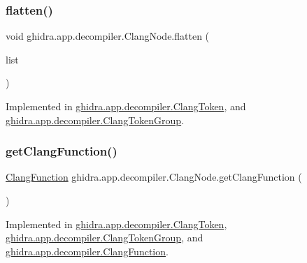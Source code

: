 \subsubsection{\texorpdfstring{flatten()}{flatten()}}
{\footnotesize\ttfamily void ghidra.\+app.\+decompiler.\+Clang\+Node.\+flatten (\begin{DoxyParamCaption}\item[{\mbox{\hyperlink{xml_8hh_ab5ab62f46b3735557c125f91b40ac155}{List}}$<$ \mbox{\hyperlink{interfaceghidra_1_1app_1_1decompiler_1_1_clang_node}{Clang\+Node}} $>$}]{list }\end{DoxyParamCaption})}



Implemented in \mbox{\hyperlink{classghidra_1_1app_1_1decompiler_1_1_clang_token_ac9713a2cef771ae4ac71d0989593b3ed}{ghidra.\+app.\+decompiler.\+Clang\+Token}}, and \mbox{\hyperlink{classghidra_1_1app_1_1decompiler_1_1_clang_token_group_ac469bdd22ba48a2941a40779f2e4630a}{ghidra.\+app.\+decompiler.\+Clang\+Token\+Group}}.

\mbox{\label{interfaceghidra_1_1app_1_1decompiler_1_1_clang_node_a715989d3fa33942a85517fae04a70ac0}} 
\subsubsection{\texorpdfstring{getClangFunction()}{getClangFunction()}}
{\footnotesize\ttfamily \mbox{\hyperlink{classghidra_1_1app_1_1decompiler_1_1_clang_function}{Clang\+Function}} ghidra.\+app.\+decompiler.\+Clang\+Node.\+get\+Clang\+Function (\begin{DoxyParamCaption}{ }\end{DoxyParamCaption})}



Implemented in \mbox{\hyperlink{classghidra_1_1app_1_1decompiler_1_1_clang_token_a786354033254b3425a2200a3141e7cfd}{ghidra.\+app.\+decompiler.\+Clang\+Token}}, \mbox{\hyperlink{classghidra_1_1app_1_1decompiler_1_1_clang_token_group_a19473d47a4c0e53a664798541388518a}{ghidra.\+app.\+decompiler.\+Clang\+Token\+Group}}, and \mbox{\hyperlink{classghidra_1_1app_1_1decompiler_1_1_clang_function_aa327efcad2a0070511834a9edb1fc270}{ghidra.\+app.\+decompiler.\+Clang\+Function}}.

